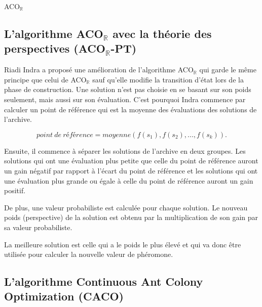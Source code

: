 \begin{algorithm}[H]
\caption{ACO$_\mathbb{R}$}
\end{algorithm}



\subsection{L'algorithme ACO$_\mathbb{R}$ avec la théorie des perspectives (\mbox{ACO$_\mathbb{R}$-PT})}
Riadi Indra \cite{riadi2014cognitive} a proposé une amélioration de l'algorithme ACO$_\mathbb{R}$ qui garde le même principe que celui de ACO$_\mathbb{R}$ sauf qu'elle modifie la transition d'état lors de la phase de construction. Une solution n'est pas choisie en se basant sur son poids seulement, mais aussi sur son évaluation. C'est pourquoi Indra commence par calculer un point de référence qui est la moyenne des évaluations des solutions de l'archive.

$$point~de~référence = moyenne (f(s_1),f(s_2),...,f(s_k)).$$

Ensuite, il commence à séparer les solutions de l'archive en deux groupes. Les solutions qui ont une évaluation plus petite que celle du point de référence auront un gain négatif par rapport à l'écart du point de référence et les solutions qui ont une évaluation plus grande ou égale à celle du point de référence auront un gain positif.

De plus, une valeur probabiliste est calculée pour chaque solution. Le nouveau poids (perspective) de la solution est obtenu par la multiplication de son gain par sa valeur probabiliste.

La meilleure solution est celle qui a le poids le plus élevé et qui va donc être utilisée pour calculer la nouvelle valeur de phéromone.

\subsection{L'algorithme Continuous Ant Colony Optimization (CACO)}

